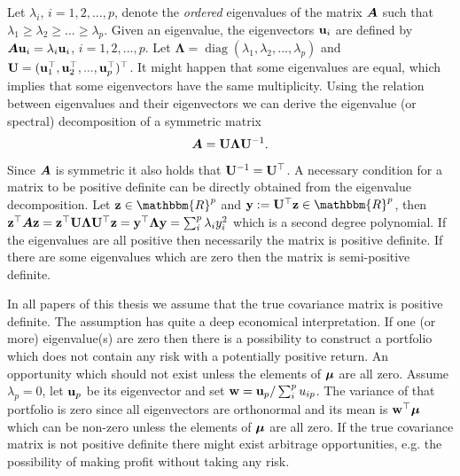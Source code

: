 \documentclass[]{book}\usepackage{knitr}
\begin{document}
Let $\lambda_i$, $i=1,2,...,p$, denote the \textit{ordered} eigenvalues of the matrix $\mbox{\boldmath$A$}$ such that $\lambda_1\geq \lambda_2 \geq ... \geq \lambda_p$.
Given an eigenvalue, the eigenvectors $\mathbf{u}_i$ are defined by $\mbox{\boldmath$A$} \mathbf{u}_i = \lambda_i \mathbf{u}_i$, $i=1,2,...,p$. 
Let $\boldsymbol{\Lambda} = \operatorname{diag}(\lambda_1, \lambda_2,...,\lambda_p)$ and $\mathbf{U}= (\mathbf{u}_1^\top, \mathbf{u}_2^\top, ..., \mathbf{u}_p^\top)^\top$. It might happen that some eigenvalues are equal, which implies that some eigenvectors have the same multiplicity.
Using the relation between eigenvalues and their eigenvectors we can derive the eigenvalue (or spectral) decomposition of a symmetric matrix 
\begin{equation}\label{eqn:eigenvalue_decomp}
	\mbox{\boldmath$A$} = \mathbf{U} \boldsymbol{\Lambda} \mathbf{U}^{-1}.
\end{equation}
Since $\mbox{\boldmath$A$}$ is symmetric it also holds that $\mathbf{U}^{-1} = \mathbf{U}^\top$.
A necessary condition for a matrix to be positive definite can be directly obtained from the eigenvalue decomposition. 
Let $\bz\in \mathbbm{R}^p$ and $\by := \bU^{\top} \bz \in \mathbbm{R}^p$, then $\mathbf{z}^\top \mbox{\boldmath$A$} \mathbf{z} = \mathbf{z}^\top \mathbf{U} \boldsymbol{\Lambda} \mathbf{U} ^{\top} \mathbf{z} = \mathbf{y}^\top \boldsymbol{\Lambda} \mathbf{y} = \sum_i^p \lambda_i y_i^2$ which is a second degree polynomial. 
If the eigenvalues are all positive then necessarily the matrix is positive definite. 
If there are some eigenvalues which are zero then the matrix is semi-positive definite. 

In all papers of this thesis we assume that the true covariance matrix is positive definite. 
The assumption has quite a deep economical interpretation.
If one (or more) eigenvalue(s) are zero then there is a possibility to construct a portfolio which does not contain any risk with a potentially positive return. 
An opportunity which should not exist unless the elements of $\mbox{\boldmath$\mu$}$ are all zero.
Assume $\lambda_p=0$, let $\mathbf{u}_p$ be its eigenvector and set $\mathbf{w} = \mathbf{u}_p / \sum_i^p u_{ip}$. 
The variance of that portfolio is zero since all eigenvectors are orthonormal and its mean is $\mathbf{w}^\top \mbox{\boldmath$\mu$}$ which can be non-zero unless the elements of $\mbox{\boldmath$\mu$}$ are all zero.
If the true covariance matrix is not positive definite there might exist arbitrage opportunities, e.g. the possibility of making profit without taking any risk.
\end{document}
